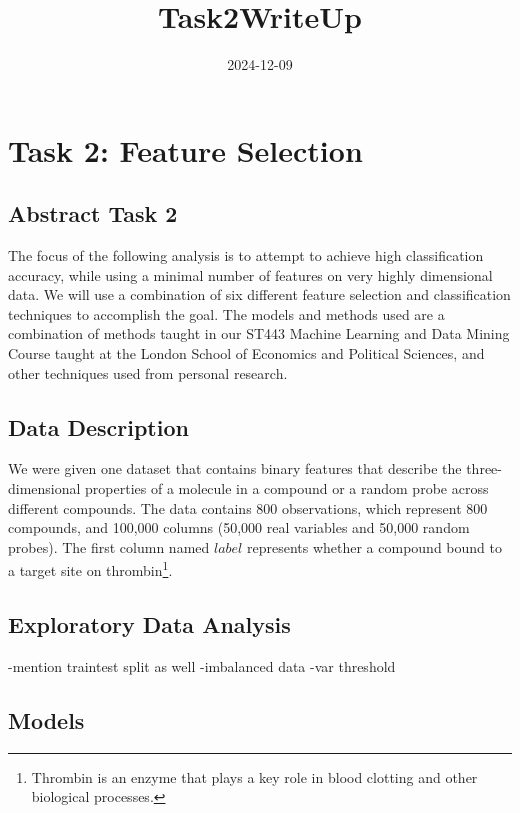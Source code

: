 \documentclass[
]{article}
\title{Task2WriteUp}
\author{}
\date{\vspace{-2.5em}2024-12-09}
\begin{document}
\maketitle

\section{Task 2: Feature Selection}\label{task-2-feature-selection}

\subsection{Abstract Task 2}\label{abstract-task-2}

The focus of the following analysis is to attempt to achieve high
classification accuracy, while using a minimal number of features on
very highly dimensional data. We will use a combination of six different
feature selection and classification techniques to accomplish the goal.
The models and methods used are a combination of methods taught in our
ST443 Machine Learning and Data Mining Course taught at the London
School of Economics and Political Sciences, and other techniques used
from personal research.

\subsection{Data Description}\label{data-description}

We were given one dataset that contains binary features that describe
the three-dimensional properties of a molecule in a compound or a random
probe across different compounds. The data contains 800 observations,
which represent 800 compounds, and 100,000 columns (50,000 real
variables and 50,000 random probes). The first column named \(label\)
represents whether a compound bound to a target site on
thrombin\footnote{Thrombin is an enzyme that plays a key role in blood
  clotting and other biological processes.}.

\subsection{Exploratory Data Analysis}\label{exploratory-data-analysis}

-mention traintest split as well -imbalanced data -var threshold

\subsection{Models}\label{models}
\end{document}
